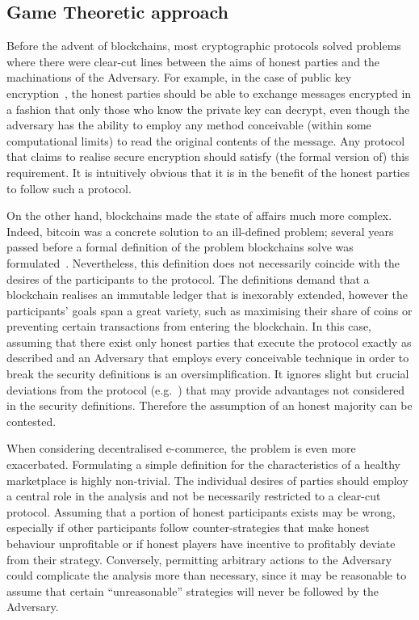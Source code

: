 \subsection{Game Theoretic approach}
  Before the advent of blockchains, most cryptographic protocols solved problems where
  there were clear-cut lines between the aims of honest parties and the machinations of
  the Adversary. For example, in the case of public key encryption~\cite{dh}, the honest
  parties should be able to exchange messages encrypted in a fashion that only those who
  know the private key can decrypt, even though the adversary has the ability to employ
  any method conceivable (within some computational limits) to read the original contents
  of the message. Any protocol that claims to realise secure encryption should satisfy
  (the formal version of) this requirement. It is intuitively obvious that it is in the
  benefit of the honest parties to follow such a protocol.

  On the other hand, blockchains made the state of affairs much more complex. Indeed,
  bitcoin was a concrete solution to an ill-defined problem; several years passed before a
  formal definition of the problem blockchains solve was formulated~\cite{backbone}.
  Nevertheless, this definition does not necessarily coincide with the desires of the
  participants to the protocol. The definitions demand that a blockchain realises an
  immutable ledger that is inexorably extended, however the participants' goals span a
  great variety, such as maximising their share of coins or preventing certain
  transactions from entering the blockchain. In this case, assuming that there exist only
  honest parties that execute the protocol exactly as described and an Adversary that
  employs every conceivable technique in order to break the security definitions is an
  oversimplification. It ignores slight but crucial deviations from the protocol
  (e.g.~\cite{selfishmine}) that may provide advantages not considered in the security
  definitions. Therefore the assumption of an honest majority can be contested.

  When considering decentralised e-commerce, the problem is even more exacerbated.
  Formulating a simple definition for the characteristics of a healthy marketplace is
  highly non-trivial. The individual desires of parties should employ a central role in
  the analysis and not be necessarily restricted to a clear-cut protocol. Assuming that a
  portion of honest participants exists may be wrong, especially if other participants
  follow counter-strategies that make honest behaviour unprofitable or if honest players
  have incentive to profitably deviate from their strategy. Conversely, permitting
  arbitrary actions to the Adversary could complicate the analysis more than necessary,
  since it may be reasonable to assume that certain ``unreasonable'' strategies will never
  be followed by the Adversary.

